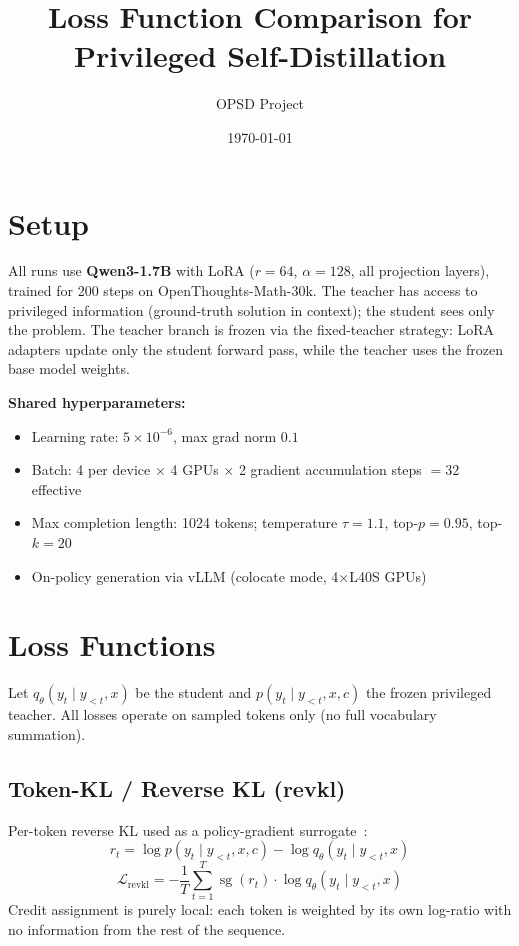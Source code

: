 \documentclass[11pt]{article}
\title{Loss Function Comparison for Privileged Self-Distillation}
\author{OPSD Project}
\date{\today}
\begin{document}
\maketitle

\section{Setup}

All runs use \textbf{Qwen3-1.7B} with LoRA ($r=64$, $\alpha=128$, all projection layers), trained for 200 steps on OpenThoughts-Math-30k. The teacher has access to privileged information (ground-truth solution in context); the student sees only the problem. The teacher branch is frozen via the fixed-teacher strategy: LoRA adapters update only the student forward pass, while the teacher uses the frozen base model weights.

\noindent\textbf{Shared hyperparameters:}
\begin{itemize}
  \item Learning rate: $5\times10^{-6}$, max grad norm $0.1$
  \item Batch: 4 per device $\times$ 4 GPUs $\times$ 2 gradient accumulation steps $= 32$ effective
  \item Max completion length: 1024 tokens; temperature $\tau = 1.1$, top-$p = 0.95$, top-$k = 20$
  \item On-policy generation via vLLM (colocate mode, 4$\times$L40S GPUs)
\end{itemize}

\section{Loss Functions}

Let $q_\theta(y_t \mid y_{<t}, x)$ be the student and $p(y_t \mid y_{<t}, x, c)$ the frozen privileged teacher. All losses operate on sampled tokens only (no full vocabulary summation).

\subsection{Token-KL / Reverse KL (revkl)}

Per-token reverse KL used as a policy-gradient surrogate~\cite{thinkingmachines2025}:
\begin{equation}
  r_t = \log p(y_t \mid y_{<t}, x, c) - \log q_\theta(y_t \mid y_{<t}, x)
\end{equation}
\begin{equation}
  \mathcal{L}_{\text{revkl}} = -\frac{1}{T}\sum_{t=1}^T \operatorname{sg}(r_t) \cdot \log q_\theta(y_t \mid y_{<t}, x)
\end{equation}
Credit assignment is purely local: each token is weighted by its own log-ratio with no information from the rest of the sequence.
\end{document}
